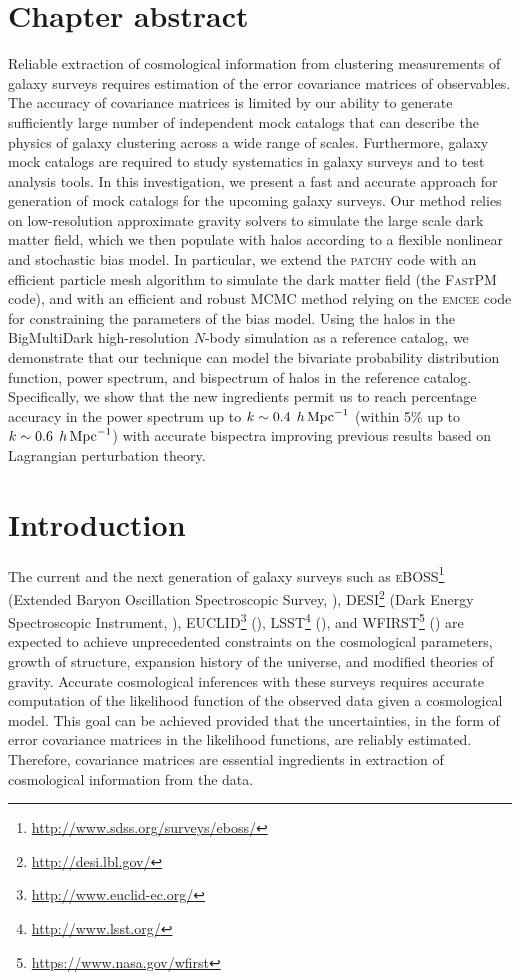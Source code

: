 \section{Chapter abstract}
Reliable extraction of cosmological information from clustering measurements of galaxy surveys requires estimation of the error covariance matrices of observables. The accuracy of covariance matrices is limited by our ability to generate sufficiently large number of independent mock catalogs that can describe the physics of galaxy clustering across a wide range of scales. 
Furthermore, galaxy mock catalogs are required to study systematics in galaxy surveys and to test analysis tools.
In this investigation, we present a fast and accurate approach for generation of mock catalogs for the upcoming galaxy surveys. 
Our method relies on low-resolution approximate gravity solvers to simulate the large scale dark matter field, which we then populate with halos according to a flexible nonlinear and stochastic bias model. 
In particular, we extend the \textsc{patchy} code with an efficient particle mesh algorithm to simulate the dark matter field (the \textsc{FastPM} code), and with an efficient and robust MCMC method relying on the \textsc{emcee} code for constraining the parameters of the bias model. 
Using the halos in the BigMultiDark high-resolution $N$-body simulation as a reference catalog, we demonstrate that our technique can model the bivariate probability distribution function, power spectrum, and bispectrum of halos in the reference catalog. Specifically, we show that the new ingredients permit us to reach percentage accuracy in the power spectrum up to $k\sim 0.4\; \,h\,{\rm Mpc}^{-1}$ (within 5\% up to $k\sim 0.6\; \,h\,{\rm Mpc}^{-1}$) with accurate bispectra improving previous results based on Lagrangian perturbation theory.

\section{Introduction}

The current and the next generation of galaxy surveys such as \textsc{eBOSS}\footnote{\url{http://www.sdss.org/surveys/eboss/}} (Extended Baryon Oscillation Spectroscopic Survey, \citealt{eBOSS}), \textsc{DESI}\footnote{\url{http://desi.lbl.gov/}} (Dark Energy Spectroscopic Instrument, \citealt{desi}), \textsc{EUCLID}\footnote{\url{http://www.euclid-ec.org/}} (\citealt{euclid}), \textsc{LSST}\footnote{\url{http://www.lsst.org/}} (\citealt{lsst}), and \textsc{WFIRST}\footnote{\url{https://www.nasa.gov/wfirst}} (\citealt{wfirst}) are expected to achieve unprecedented constraints on the cosmological parameters, growth of structure, expansion history of the universe, and modified theories of gravity. Accurate cosmological inferences with these surveys requires accurate computation of the likelihood function of the observed data given a cosmological model. This goal can be achieved provided that the uncertainties, in the form of error covariance matrices in the likelihood functions, are reliably estimated. Therefore, covariance matrices are essential ingredients in extraction of cosmological information from the data.

